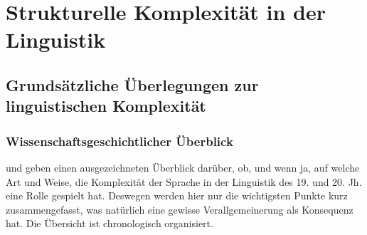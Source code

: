 \chapter{Strukturelle Komplexität in der Linguistik}\label{2}

\section{Grundsätzliche Überlegungen zur linguistischen Komplexität}\label{2.1}

\subsection{Wissenschaftsgeschichtlicher Überblick}\label{2.1.1}

\citet[1--5]{Kusters2003} und \citet{Sampson2009} geben einen ausgezeichneten Überblick darüber, ob, und wenn ja, auf welche Art und Weise, die Komplexität der Sprache in der Linguistik des 19. und 20. Jh. eine Rolle gespielt hat. Deswegen werden hier nur die wichtigsten Punkte kurz zusammengefasst, was natürlich eine gewisse Verallgemeinerung als Konsequenz hat. Die Übersicht ist chronologisch organisiert.

